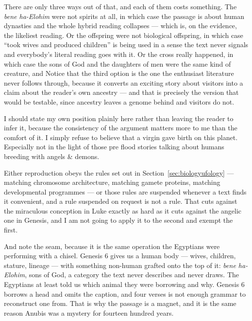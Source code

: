 There are only three ways out of that, and each of them costs something. The \emph{bene ha-Elohim}
were not spirits at all, in which case the passage is about human dynasties and the whole hybrid
reading collapses --- which is, on the evidence, the likeliest reading. Or the offspring were not
biological offspring, in which case ``took wives and produced children'' is being used in a sense
the text never signals and everybody's literal reading goes with it. Or the cross really happened,
in which case the sons of God and the daughters of men were the same kind of creature, and
 Notice that the third option is the
one the enthusiast literature never follows through, because it converts an exciting story about
visitors into a claim about the reader's own ancestry --- and that is precisely the version that
would be testable, since ancestry leaves a genome behind and visitors do not.

I should state my own position plainly here rather than leaving the reader to infer it, because
the consistency of the argument matters more to me than the comfort of it. I simply refuse to
believe that a virgin gave birth on this planet. Especially not in the light of those pre flood
stories talking about humans breeding with angels \& demons.

 Either reproduction obeys the rules set out in Section~\ref{sec:biologyufology} --- matching
chromosome architecture, matching gamete proteins, matching developmental programmes --- or those
rules are suspended whenever a text finds it convenient, and a rule suspended on request is not a
rule. That cuts against the miraculous conception in Luke exactly as hard as it cuts against the
angelic one in Genesis, and I am not going to apply it to the second and exempt the first.

And note the seam, because it is the same operation the Egyptians were performing with a chisel.
Genesis 6 gives us a human body --- wives, children, stature, lineage --- with something
non-human grafted onto the top of it: \emph{bene ha-Elohim}, sons of God, a category the text
never describes and never draws. The Egyptians at least told us which animal they were borrowing
and why. Genesis 6 borrows a head and omits the caption, and four verses is not enough grammar to
reconstruct one from. That is why the passage is a magnet, and it is the same reason Anubis was a
mystery for fourteen hundred years.

